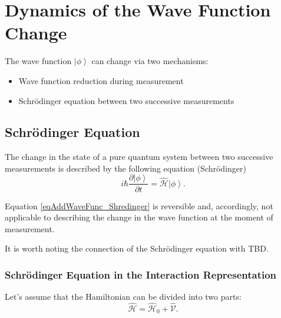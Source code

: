 \section{Dynamics of the Wave Function Change}
\label{AddWaveFunc}
The wave function $\left| \phi \right>$ can change via two mechanisms:
\begin{itemize}
\item Wave function reduction during measurement
\item Schrödinger equation between two successive measurements
\end{itemize}

\subsection{Schrödinger Equation}
The change in the state of a pure quantum system between two successive measurements is described by the following equation (Schrödinger)
\begin{equation}
i \hbar \frac{\partial \left| \phi \right>}{\partial t} = \hat{\mathcal{H}}
\left| \phi \right>.
\label{eqAddWaveFunc_Shredinger}
\end{equation}

Equation \eqref{eqAddWaveFunc_Shredinger} is reversible and, accordingly, not applicable to describing the change in the wave function at the moment of measurement.

It is worth noting the connection of the Schrödinger equation with  TBD.

\subsubsection{Schrödinger Equation in the Interaction Representation}
\label{AddWaveFuncInter}
Let's assume that the Hamiltonian can be divided into two parts:
\begin{equation}
\hat{\mathcal{H}} = \hat{\mathcal{H}}_0 + \hat{\mathcal{V}}.
\nonumber
\end{equation}

